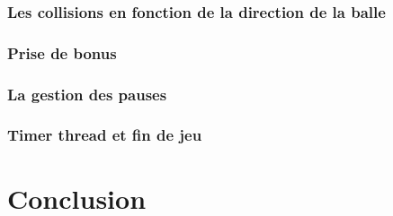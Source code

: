 \documentclass{article}
\begin{document}
\subsubsection{Les collisions en fonction de la direction de la balle}
\subsubsection{Prise de bonus}
\subsubsection{La gestion des pauses}
\subsubsection{Timer thread et fin de jeu}
\section{Conclusion}
\end{document}
